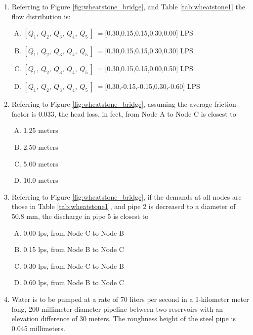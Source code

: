 \documentclass[11pt]{article}
\begin{document}
\begin{enumerate}



\item Referring to Figure \ref{fig:wheatstone_bridge}, and Table \ref{tab:wheatstone1} the flow distribution is:
\begin{enumerate}[(A)]
\item $[Q_1,~Q_2,~Q_3,~Q_4,~Q_5~]~=$[0.30,0.15,0.15,0.30,0.00] LPS
\item $[Q_1,~Q_2,~Q_3,~Q_4,~Q_5~]~=$[0.30,0.15,0.15,0.30,0.30] LPS
\item $[Q_1,~Q_2,~Q_3,~Q_4,~Q_5~]~=$[0.30,0.15,0.15,0.00,0.50] LPS
\item $[Q_1,~Q_2,~Q_3,~Q_4,~Q_5~]~=$[0.30,-0.15,-0.15,0.30,-0.60] LPS
\end{enumerate}
\item Referring to Figure \ref{fig:wheatstone_bridge}, assuming the average friction factor is $0.033$, the head loss, in feet, from Node A to Node C is closest to
\begin{enumerate}[(A)]
\item 1.25 meters 
\item 2.50 meters
\item 5.00 meters
\item 10.0 meters
\end{enumerate}
\item Referring to Figure \ref{fig:wheatstone_bridge}, if the demands at all nodes are those in Table \ref{tab:wheatstone1}, and pipe 2 is decreased to a diameter of 50.8 mm, the discharge in pipe 5 is closest to
\begin{enumerate}[(A)]
\item 0.00 lps, from Node C to Node B  %
\item 0.15 lps, from Node B to Node C
\item 0.30 lps, from Node C to Node B
\item 0.60 lps, from Node B to Node C
\end{enumerate}
\clearpage
\item Water is to be pumped at a rate of 70 liters per second in a 1-kilometer meter long, 200 millimeter diameter pipeline between two reservoirs with an elevation difference of 30 meters.  The roughness height of the steel pipe is 0.045 millimeters.   


\end{enumerate}
\end{document}
